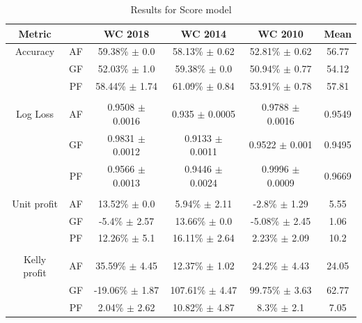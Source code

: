 \begin{table}
    \caption{Results for Score model}
    \begin{tabular}{| c  c| c| c| c|c|}
        \hline
        Metric& & \textbf{WC 2018} & \textbf{WC 2014} & \textbf{WC 2010} & Mean\\
        \hline
        Accuracy & AF & 59.38\% $\pm$ 0.0 & 58.13\% $\pm$ 0.62 & 52.81\% $\pm$ 0.62& 56.77 \\
         & GF & 52.03\% $\pm$ 1.0 & 59.38\% $\pm$ 0.0 & 50.94\% $\pm$ 0.77& 54.12 \\
         & PF & 58.44\% $\pm$ 1.74 & 61.09\% $\pm$ 0.84 & 53.91\% $\pm$ 0.78& 57.81 \\
         & & & & & \\
        Log Loss & AF & 0.9508 $\pm$ 0.0016 & 0.935 $\pm$ 0.0005 & 0.9788 $\pm$ 0.0016& 0.9549 \\
         & GF & 0.9831 $\pm$ 0.0012 & 0.9133 $\pm$ 0.0011 & 0.9522 $\pm$ 0.001& 0.9495 \\
         & PF & 0.9566 $\pm$ 0.0013 & 0.9446 $\pm$ 0.0024 & 0.9996 $\pm$ 0.0009& 0.9669 \\
         & & & & & \\
        Unit profit & AF & 13.52\% $\pm$ 0.0 & 5.94\% $\pm$ 2.11 & -2.8\% $\pm$ 1.29& 5.55 \\
         & GF & -5.4\% $\pm$ 2.57 & 13.66\% $\pm$ 0.0 & -5.08\% $\pm$ 2.45& 1.06 \\
         & PF & 12.26\% $\pm$ 5.1 & 16.11\% $\pm$ 2.64 & 2.23\% $\pm$ 2.09& 10.2 \\
         & & & & & \\
        Kelly profit & AF & 35.59\% $\pm$ 4.45 & 12.37\% $\pm$ 1.02 & 24.2\% $\pm$ 4.43& 24.05 \\
         & GF & -19.06\% $\pm$ 1.87 & 107.61\% $\pm$ 4.47 & 99.75\% $\pm$ 3.63& 62.77 \\
         & PF & 2.04\% $\pm$ 2.62 & 10.82\% $\pm$ 4.87 & 8.3\% $\pm$ 2.1& 7.05 \\
 \hline
    \end{tabular}
    \label{table:scoreresults}
\end{table}

